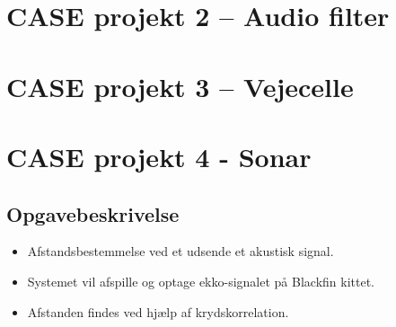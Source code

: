 \documentclass[danish]{article}
\begin{document}
\section{CASE projekt 2 – Audio filter}
\newpage
\section{CASE projekt 3 – Vejecelle}

\newpage
\section{CASE projekt 4 - Sonar}
\subsection{Opgavebeskrivelse}
\begin{itemize}
	\item Afstandsbestemmelse ved et udsende et akustisk signal.
	\item Systemet vil afspille og optage ekko-signalet på Blackfin kittet.
	\item Afstanden findes ved hjælp af krydskorrelation. 
\end{itemize}
	
\end{document}

